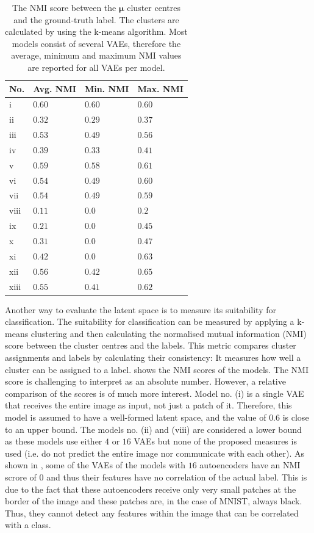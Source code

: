 \begin{table}[h] 
    \centering
	 \begin{tabular}{l l l l}
    	\textbf{No.} & \textbf{Avg. NMI} & \textbf{Min. NMI} & \textbf{Max. NMI}\\
        \hline
		i & $0.60$ & $0.60$ & $0.60$ \\
		
		ii & $0.32$  & $0.29$ & $0.37$ \\
		iii & $0.53$ & $0.49$ & $0.56$ \\
		iv & $0.39$ & $0.33$ & $0.41$\\
		v & $0.59$ & $0.58$ & $0.61$ \\
		vi & $0.54$ & $0.49$ & $0.60$ \\
		vii & $0.54$ & $0.49$ & $0.59$\\
		
		viii & $0.11$ & $0.0$ & $0.2$\\
		ix & $0.21$ & $0.0$ & $0.45$\\
		x & $0.31$ & $0.0$ & $0.47$\\
		xi & $0.42$ & $0.0$ & $0.63$ \\
		xii & $0.56$ & $0.42$ & $0.65$ \\
		xiii & $0.55$ & $0.41$ & $0.62$\\
    \end{tabular}
    \caption[NMI score of different architectures]{The NMI score between the $\boldsymbol{\mu}$ cluster centres and the ground-truth label. The clusters are calculated by using the k-means algorithm. Most models consist of several VAEs, therefore the average, minimum and maximum NMI values are reported for all VAEs per model.}
\end{table}

Another way to evaluate the latent space is to measure its suitability for classification. The suitability for classification can be measured by applying a k-means clustering and then calculating the normalised mutual information (NMI) score between the cluster centres and the labels. This metric compares cluster assignments and labels by calculating their consistency: It measures how well a cluster can be assigned to a label.  shows the NMI scores of the models.
The NMI score is challenging to interpret as an absolute number. However, a relative comparison of the scores is of much more interest. Model no. (i) is a single VAE that receives the entire image as input, not just a patch of it. Therefore, this model is assumed to have a well-formed latent space, and the value of $0.6$ is close to an upper bound.
The models no. (ii) and (viii) are considered a lower bound as these models use either $4$ or $16$ VAEs but none of the proposed measures is used (i.e. do not predict the entire image nor communicate with each other). 
As shown in , some of the VAEs of the models with $16$ autoencoders have an NMI scrore of $0$ and thus their features have no correlation of the actual label. This is due to the fact that these autoencoders receive only very small patches at the border of the image and these patches are, in the case of MNIST, always black. Thus, they cannot detect any features within the image that can be correlated with a class.

